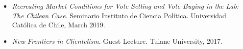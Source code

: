 \begin{itemize}
	\item \emph{Recreating Market Conditions for Vote-Selling and Vote-Buying in the Lab: The Chilean Case}. Seminario Instituto de Ciencia Pol\'itica. Universidad Cat\'olica de Chile, March 2019.
	\item \emph{New Frontiers in Clientelism}. Guest Lecture. Tulane University, 2017.
\end{itemize}
